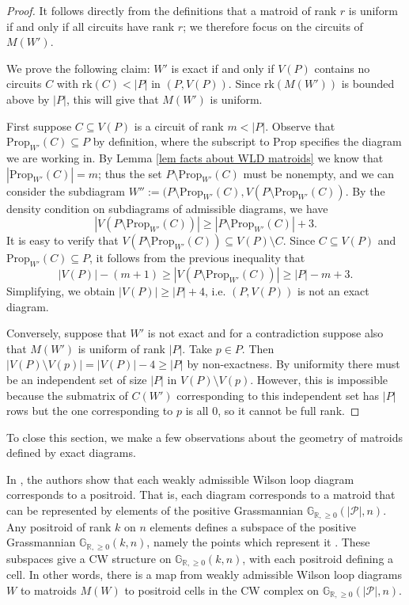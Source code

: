 \documentclass[11pt]{article}
\newcommand{\hlfix}[2]{\texthl{#1}\todo{#2}}
\newcommand{\R}{\mathbb{R}}
\newcommand{\Gr}{\mathbb{G}_{\R, \geq 0}}
\newcommand{\rk}{\textrm{rk} }
\newcommand{\cP}{\mathcal{P}}
\newcommand{\Prop}{\textrm{Prop}}
\theoremstyle{remark}
\theoremstyle{definition}
\begin{document}
\begin{proof}
It follows directly from the definitions that a matroid of rank $r$ is uniform if and only if all circuits have rank $r$; we therefore focus on the circuits of $M(W')$.

We prove the following claim: $W'$ is exact if and only if $V(P)$ contains no circuits $C$ with $\rk (C)< |P|$ in $(P, V(P))$. Since $\rk(M(W'))$ is bounded above by $|P|$, this will give that  $M(W')$ is uniform.

First suppose $C \subseteq V(P)$ is a circuit of rank $m < |P|$. Observe that $\Prop_{W'}(C)\subseteq P$ by definition, where the subscript to $\Prop$ specifies the diagram we are working in. By Lemma \ref{lem facts about WLD matroids} we know that ${|\Prop_{W'}(C)| = m}$; thus the set $P \setminus \Prop_{W'}(C)$ must be nonempty, and we can consider the subdiagram $W'':= (P\setminus \Prop_{W'}(C),V(P\setminus\Prop_{W'}(C))$. By the density condition on subdiagrams of admissible diagrams, we have
\[|V(P\setminus\Prop_{W'}(C))| \geq |P\setminus\Prop_{W'}(C)| + 3.\]
It is easy to verify that $V(P\setminus\Prop_{W'}(C)) \subseteq V(P)\setminus C$. Since $C \subseteq V(P)$ and $\Prop_{W'}(C) \subseteq P$, it follows from the previous inequality that
\[|V(P)| - (m+1) \geq |V(P\setminus\Prop_{W'}(C))| \geq |P| - m + 3.\]
Simplifying, we obtain $|V(P)| \geq |P| + 4$, i.e. $(P,V(P))$ is not an exact diagram.

Conversely, suppose that $W'$ is not exact and for a contradiction suppose also that $M(W')$ is uniform of rank $|P|$.  Take $p \in P$.  Then $|V(P)\setminus V(p)| = |V(P)| - 4 \geq |P|$ by non-exactness.  By uniformity there must be an independent set of size $|P|$ in $V(P)\setminus V(p)$.  However, this is impossible because the submatrix of $C(W')$ corresponding to this independent set has $|P|$ rows but the one corresponding to $p$ is all $0$, so it cannot be full rank.
\end{proof}

To close this section, we make a few observations about the geometry of matroids defined by exact diagrams.

In \cite{wilsonloop}, the authors show that each weakly admissible Wilson loop diagram corresponds to a positroid. That is, each diagram corresponds to a matroid that can be represented by elements of the positive Grassmannian $\Gr(|\cP|, n)$. Any positroid of rank $k$ on $n$ elements defines a subspace of the positive Grassmannian $\Gr(k, n)$, namely the points which represent it \cite{Postnikov}. These subspaces give a CW structure on $\Gr(k,n)$, with each positroid defining a cell.  In other words, there is a map from weakly admissible Wilson loop diagrams $W$ to matroids $M(W)$ to positroid cells in the CW complex on $\Gr(|\cP|, n)$.
\end{document}
